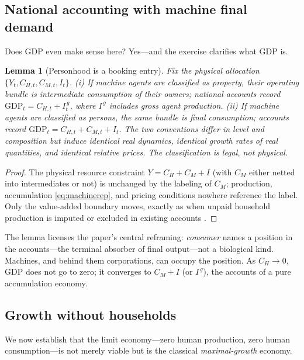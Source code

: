 \documentclass[11pt]{article}
\newtheorem{lemma}{Lemma}
\begin{document}
\subsection{National accounting with machine final demand}\label{sec:accounting}

Does GDP even make sense here? Yes---and the exercise clarifies what GDP is.

\begin{lemma}[Personhood is a booking entry]\label{lem:accounting}
Fix the physical allocation $\{Y_t, C_{H,t}, C_{M,t}, I_t\}$. (i) If machine agents are classified as \emph{property}, their operating bundle is intermediate consumption of their owners; national accounts record $\mathrm{GDP}_t = C_{H,t} + I_t^{\,g}$, where $I^{\,g}$ includes gross agent production. (ii) If machine agents are classified as \emph{persons}, the same bundle is final consumption; accounts record $\mathrm{GDP}_t = C_{H,t} + C_{M,t} + I_t$. The two conventions differ in level and composition but induce identical real dynamics, identical growth rates of real quantities, and identical relative prices. The classification is legal, not physical.
\end{lemma}

\begin{proof}
The physical resource constraint $Y = C_H + C_M + I$ (with $C_M$ either netted into intermediates or not) is unchanged by the labeling of $C_M$; production, accumulation \eqref{eq:machinerep}, and pricing conditions nowhere reference the label. Only the value-added boundary moves, exactly as when unpaid household production is imputed or excluded in existing accounts \citep{coyle2014}.
\end{proof}

The lemma licenses the paper's central reframing: \emph{consumer} names a position in the accounts---the terminal absorber of final output---not a biological kind. Machines, and behind them corporations, can occupy the position. As $C_H \to 0$, GDP does not go to zero; it converges to $C_M + I$ (or $I^{\,g}$), the accounts of a pure accumulation economy.

\subsection{Growth without households}\label{sec:vn}

We now establish that the limit economy---zero human production, zero human consumption---is not merely viable but is the classical \emph{maximal-growth} economy.
\end{document}
